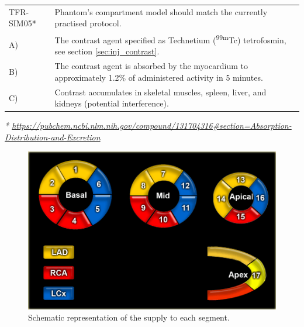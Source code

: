\begin{table} [H]
\begin{tabular}{l|p{120mm}|}
	TFR-SIM05* & Phantom's compartment model should match the currently practised protocol.\\
	\hspace{1.5cm} A) & The contrast agent specified as Technetium (\textsuperscript{99m}Tc) tetrofosmin, see section \ref{sec:inj_contrast}. \\
	\hspace{1.5cm} B) & The contrast agent is absorbed by the myocardium to approximately 1.2\% of administered activity in 5 minutes. \\
	\hspace{1.5cm} C) & Contrast accumulates in skeletal muscles, spleen, liver, and kidneys (potential interference). \\
	\cline{2-2}
\end{tabular}
\raggedright
\textit{* \url{https://pubchem.ncbi.nlm.nih.gov/compound/131704316\#section=Absorption-Distribution-and-Excretion}}
\end{table}

\begin{figure}
	\includegraphics[width=0.5\linewidth]{./images/17_supply.png}
	\caption{Schematic representation of the supply to each segment.}
	\label{fig:segment_supply}
\end{figure}

